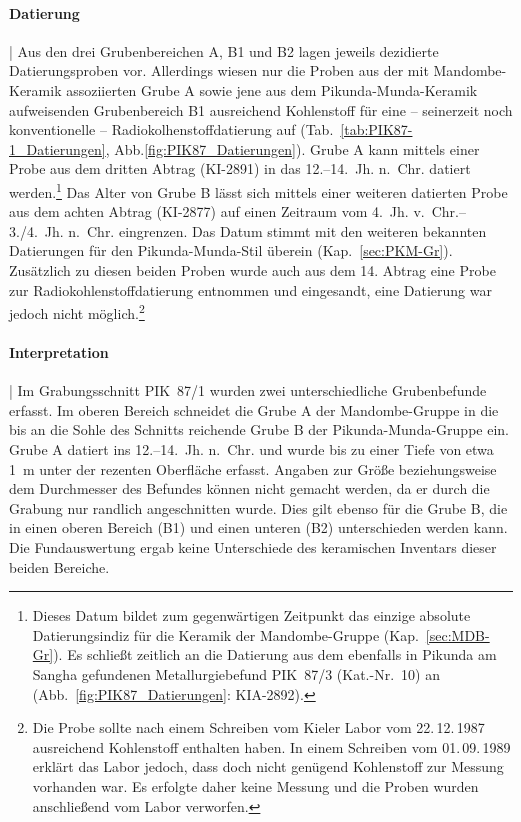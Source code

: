 \paragraph{Datierung}\hspace{-.5em}|\hspace{.5em}%
Aus den drei Grubenbereichen A, B1 und B2 lagen jeweils dezidierte Datierungsproben vor. Allerdings wiesen nur die Proben aus der mit Mandombe-Keramik assoziierten Grube A sowie jene aus dem Pikunda-Munda-Keramik aufweisenden Grubenbereich B1 ausreichend Kohlenstoff für eine -- seinerzeit noch konventionelle -- Radiokolhenstoffdatierung auf (Tab.~\ref{tab:PIK87-1_Datierungen}, Abb.\ref{fig:PIK87_Datierungen}). Grube A kann mittels einer Probe aus dem dritten Abtrag (KI-2891) in das 12.--14.~Jh. n.~Chr. datiert werden.\footnote{Dieses Datum bildet zum gegenwärtigen Zeitpunkt das einzige absolute Datierungsindiz für die Keramik der Mandombe-Gruppe (Kap.~\ref{sec:MDB-Gr}). Es schließt zeitlich an die Datierung aus dem ebenfalls in Pikunda am \mbox{Sangha} gefundenen Metallurgiebefund PIK~87/3 (Kat.-Nr.~10) an (Abb.~\ref{fig:PIK87_Datierungen}: KIA-2892).} Das Alter von Grube B lässt sich mittels einer weiteren datierten Probe aus dem achten Abtrag (KI-2877) auf einen Zeitraum vom 4.~Jh. v.~Chr.--3./4.~Jh. n.~Chr. eingrenzen. Das Datum stimmt mit den weiteren bekannten Datierungen für den Pikunda-Munda-Stil überein (Kap.~\ref{sec:PKM-Gr}). Zusätzlich zu diesen beiden Proben wurde auch aus dem 14. Abtrag eine Probe zur Radiokohlenstoffdatierung entnommen und eingesandt, eine Datierung war jedoch nicht möglich.\footnote{Die Probe sollte nach einem Schreiben vom Kieler Labor vom 22.\,12.\,1987 ausreichend Kohlenstoff enthalten haben. In einem Schreiben vom 01.\,09.\,1989 erklärt das Labor jedoch, dass doch nicht genügend Kohlenstoff zur Messung vorhanden war. Es erfolgte daher keine Messung und die Proben wurden anschließend vom Labor verworfen.}

\paragraph{Interpretation}\hspace{-.5em}|\hspace{.5em}%
Im Grabungsschnitt PIK~87/1 wurden zwei unterschiedliche Grubenbefunde erfasst. Im oberen Bereich schneidet die Grube A der Mandombe-Gruppe in die bis an die Sohle des Schnitts reichende Grube B der Pikunda-Munda-Gruppe ein. Grube A datiert ins 12.--14.~Jh. n.~Chr. und wurde bis zu einer Tiefe von etwa 1~m unter der rezenten Oberfläche erfasst. Angaben zur Größe beziehungsweise dem Durchmesser des Befundes können nicht gemacht werden, da er durch die Grabung nur randlich angeschnitten wurde. Dies gilt ebenso für die Grube B, die in einen oberen Bereich (B1) und einen unteren (B2) unterschieden werden kann. Die Fundauswertung ergab keine Unterschiede des keramischen Inventars dieser beiden Bereiche.

